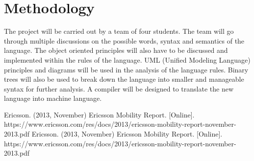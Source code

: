 \documentclass{article}
\begin{document}
\section{Methodology}
The project will be carried out by a team of four students. The team will go through multiple \cite{key:2} discussions on the possible words, syntax and semantics of the language. The object oriented principles will also have to be discussed and implemented within the rules of the language. UML (Unified Modeling Language) principles and diagrams will be used in the analysis of the language rules. Binary trees will also be used to break down the language into smaller and manageable syntax for further analysis. A compiler will be designed to translate the new language into machine language.



\begin{thebibliography}{9}
 Ericsson. (2013, November)  Ericsson Mobility Report. [Online].
https://www.ericsson.com/res/docs/2013/ericsson-mobility-report-november-2013.pdf
 Ericsson. (2013, November)  Ericsson Mobility Report. [Online].
https://www.ericsson.com/res/docs/2013/ericsson-mobility-report-november-2013.pdf
\end{thebibliography}
\end{document}
